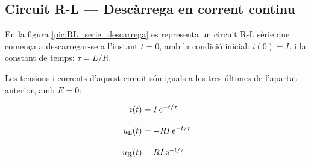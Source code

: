\subsection{Circuit R-L --- Descàrrega en corrent continu}\label{sec:RL-descarrega}

En la figura \vref{pic:RL_serie_descarrega} es representa un circuit R-L sèrie que comença a descarregar-se a l'instant $t=0$, amb la condició inicial: $i(0) = I$, i la constant de temps: $\tau = L/R$.
\begin{center}
    
    \label{pic:RL_serie_descarrega}
\end{center}


Les tensions i corrents d'aquest circuit són iguals a les tres últimes de l'apartat anterior, amb $E=0$:

\hfill
\begin{minipage}[b]{9cm}
    
\end{minipage}
\hfill
\begin{minipage}[b]{6cm}
    \begin{align}
        i(t) &= I\,\mathrm{e}^{-t/\tau} \label{eq:RL-i-descarrega}\\[3mm]
        u_\mathrm{L}(t) &= - R I\,\mathrm{e}^{-t/\tau}\label{eq:RL-ul-descarrega} \\[3mm]
        u_\mathrm{R}(t) &= R I\,\mathrm{e}^{-t/\tau}
    \end{align}
\end{minipage}



